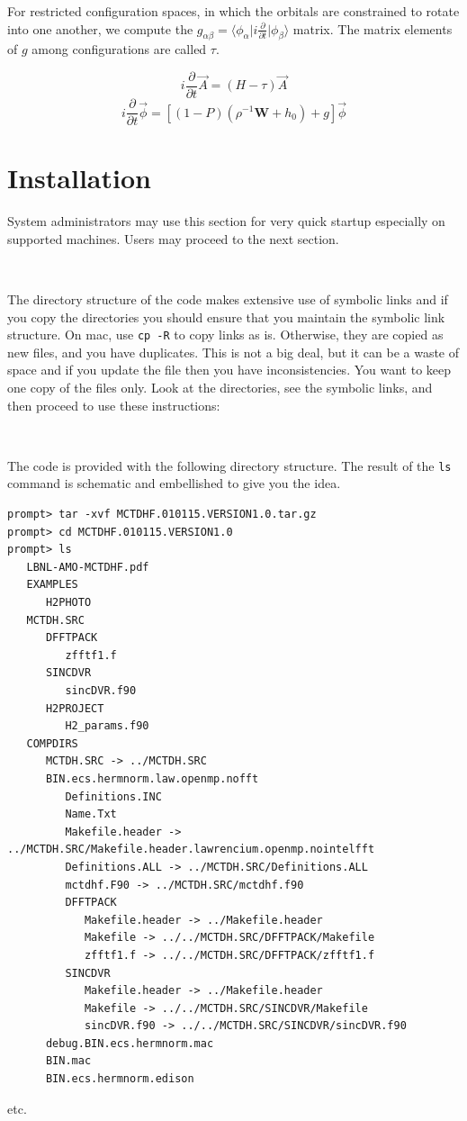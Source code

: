 \documentclass[10pt,leqno, oneside]{book}
\begin{document}
For restricted configuration spaces, in which the orbitals are constrained to rotate into one another, we compute the 
$g_{\alpha\beta}=\langle \phi_\alpha \vert i\frac{\partial}{\partial t} \vert \phi_\beta \rangle $ matrix.  The matrix elements of $g$
among configurations are called $\tau$.

\begin{equation} \nonumber
i\frac{\partial}{\partial t} \vec{A} = (H - \tau) \vec{A}
\end{equation}
\begin{equation} \nonumber
%
%
i\frac{\partial}{\partial t} \vec{\phi} = \left [ (1-P) \left( \rho^{-1} \mathbf{W} + h_0 \right) + g \right] \vec{\phi}
%
\end{equation}


\chapter{Installation\label{installchapter}}

System administrators may use this section for very quick startup especially on supported machines.  Users may proceed to the next section.

\

The directory structure of the code makes extensive use of symbolic links and if you copy the directories you should ensure that you maintain 
the symbolic link structure.  On mac, use \verb#cp -R# to copy links as is.  Otherwise, they are copied as new files, and you have duplicates.  
This is not a big deal, but it can be a waste of space and if you update the file then you have inconsistencies.  You want to keep one copy of the files only.
Look at the directories, see the symbolic links, and then proceed to use these instructions:

\

The code is provided with the following directory structure.  The result of the \verb#ls# command is schematic and embellished to give you the idea.
%
{\footnotesize
\begin{verbatim}
prompt> tar -xvf MCTDHF.010115.VERSION1.0.tar.gz
prompt> cd MCTDHF.010115.VERSION1.0
prompt> ls
   LBNL-AMO-MCTDHF.pdf
   EXAMPLES
      H2PHOTO
   MCTDH.SRC
      DFFTPACK
         zfftf1.f
      SINCDVR
         sincDVR.f90
      H2PROJECT
         H2_params.f90
   COMPDIRS
      MCTDH.SRC -> ../MCTDH.SRC
      BIN.ecs.hermnorm.law.openmp.nofft
         Definitions.INC
         Name.Txt
         Makefile.header -> ../MCTDH.SRC/Makefile.header.lawrencium.openmp.nointelfft
         Definitions.ALL -> ../MCTDH.SRC/Definitions.ALL
         mctdhf.F90 -> ../MCTDH.SRC/mctdhf.f90
         DFFTPACK
            Makefile.header -> ../Makefile.header
            Makefile -> ../../MCTDH.SRC/DFFTPACK/Makefile
            zfftf1.f -> ../../MCTDH.SRC/DFFTPACK/zfftf1.f
         SINCDVR
            Makefile.header -> ../Makefile.header
            Makefile -> ../../MCTDH.SRC/SINCDVR/Makefile
            sincDVR.f90 -> ../../MCTDH.SRC/SINCDVR/sincDVR.f90
      debug.BIN.ecs.hermnorm.mac
      BIN.mac
      BIN.ecs.hermnorm.edison
\end{verbatim}}
%
etc.
\end{document}
